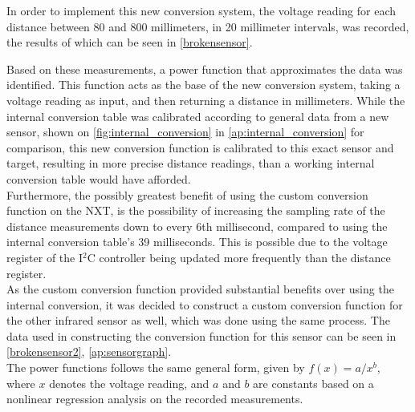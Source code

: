 In order to implement this new conversion system, the voltage reading for each distance between 80 and 800 millimeters, in 20 millimeter intervals, was recorded, the results of which can be seen in \cref{brokensensor}. 



Based on these measurements, a power function that approximates the data was identified. This function acts as the base of the new conversion system, taking a voltage reading as input, and then returning a distance in millimeters. While the internal conversion table was calibrated according to general data from a new sensor, shown on \cref{fig:internal_conversion} in \cref{ap:internal_conversion} for comparison, this new conversion function is calibrated to this exact sensor and target, resulting in more precise distance readings, than a working internal conversion table would have afforded. \\

Furthermore, the possibly greatest benefit of using the custom conversion function on the NXT, is the possibility of increasing the sampling rate of the distance measurements down to every 6th millisecond, compared to using the internal conversion table's 39 milliseconds. This is possible due to the voltage register of the I$^2$C controller being updated more frequently than the distance register.\label{pollingrate} \\

As the custom conversion function provided substantial benefits over using the internal conversion, it was decided to construct a custom conversion function for the other infrared sensor as well, which was done using the same process. The data used in constructing the conversion function for this sensor can be seen in \cref{brokensensor2}, \cref{ap:sensorgraph}. \\

The power functions follows the same general form, given by $f(x) = a/x^b$, where $x$ denotes the voltage reading, and $a$ and $b$ are constants based on a nonlinear regression analysis on the recorded measurements. 



